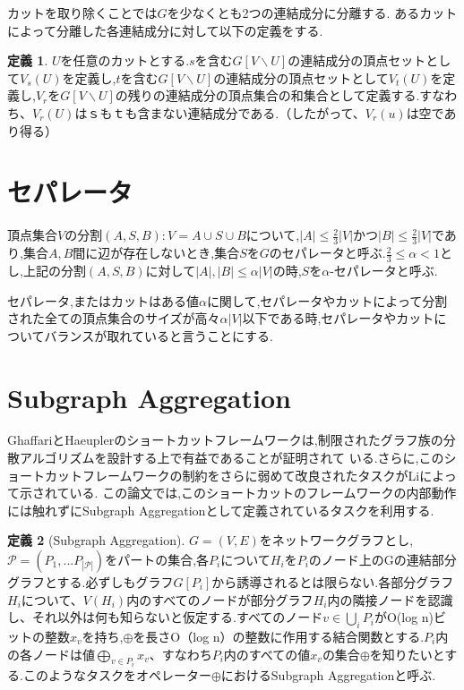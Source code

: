 \documentclass{thesis}
\theoremstyle{definition}
\newtheorem{definition}{定義}
\begin{document}
カットを取り除くことでは$G$を少なくとも2つの連結成分に分離する.
あるカットによって分離した各連結成分に対して以下の定義をする.

\begin{definition}
    $U$を任意のカットとする.$s$を含む$G[V\backslash U]$の連結成分の頂点セットとして$V_s(U)$を定義し,$t$を含む$G [V\backslash U]$の連結成分の頂点セットとして$V_t(U)$を定義し,$V_r$を$G [V \backslash U]$の残りの連結成分の頂点集合の和集合として定義する.すなわち、$V_r(U)$は$ｓ$も$ｔ$も含まない連結成分である.（したがって、$V_r(u)$は空であり得る）
\end{definition}

\section{セパレータ}
頂点集合$V$の分割$(A,S,B):V=A \cup S \cup B$について,$|A|\leq \frac{2}{3}|V|$かつ$|B|\leq \frac{2}{3}|V|$であり,集合$A,B$間に辺が存在しないとき,集合$S$を$G$のセパレータと呼ぶ.$\frac{2}{3} \leq \alpha < 1$とし,上記の分割$(A,S,B)$に対して$|A|,|B|\leq \alpha|V|$の時,$S$を$\alpha$-セパレータと呼ぶ.\par
セパレータ,またはカットはある値$\alpha$に関して,セパレータやカットによって分割された全ての頂点集合のサイズが高々$\alpha |V|$以下である時,セパレータやカットについてバランスが取れていると言うことにする.

\section{Subgraph Aggregation}
GhaffariとHaeupler\cite{ghaffari2016distributed}のショートカットフレームワークは,制限されたグラフ族の分散アルゴリズムを設計する上で有益であることが証明されて
いる.さらに,このショートカットフレームワークの制約をさらに弱めて改良されたタスクがLi\cite{li2018distributed}によって示されている.
この論文では,このショートカットのフレームワークの内部動作には触れずにSubgraph Aggregationとして定義されているタスクを利用する.

\begin{definition}[Subgraph Aggregation\cite{li2018distributed}\cite{haeupler2018round}]
    $G=(V,E)$をネットワークグラフとし,$\mathcal{P} =(P_1,...P_{|\mathcal{P}|})$をパートの集合,各$P_i$について$H_i$を$P_i$のノード上のGの連結部分グラフとする.必ずしもグラフ$G[P_i]$から誘導されるとは限らない.各部分グラフ$H_i$について、$V(H_i)$内のすべてのノードが部分グラフ$H_i$内の隣接ノードを認識し、それ以外は何も知らないと仮定する.すべてのノード$v\in \bigcup_iP_i$がO(log n)ビットの整数$x_v$を持ち,$\oplus$を長さO（log n）の整数に作用する結合関数とする.$P_i$内の各ノードは値$\bigoplus_{v\in P_i}x_v$、すなわち$P_i$内のすべての値$x_v$の集合$\oplus$を知りたいとする.このようなタスクをオペレーター$\oplus$におけるSubgraph Aggregationと呼ぶ.
\end{definition}
\end{document}
